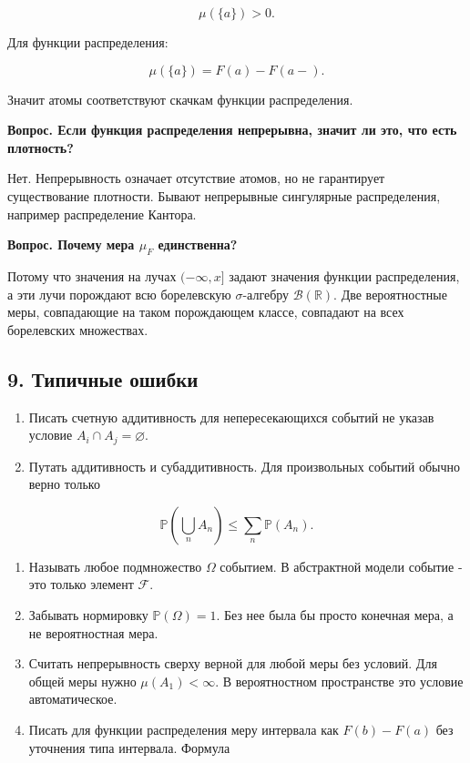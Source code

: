 \documentclass[
  11pt,
  a4paper,
]{article}
\begin{document}
\[
\mu(\{a\})>0.
\]

Для функции распределения:

\[
\mu(\{a\})=F(a)-F(a-).
\]

Значит атомы соответствуют скачкам функции распределения.

\textbf{Вопрос. Если функция распределения непрерывна, значит ли это,
что есть плотность?}

Нет. Непрерывность означает отсутствие атомов, но не гарантирует
существование плотности. Бывают непрерывные сингулярные распределения,
например распределение Кантора.

\textbf{Вопрос. Почему мера \(\mu_F\) единственна?}

Потому что значения на лучах \((-\infty,x]\) задают значения функции
распределения, а эти лучи порождают всю борелевскую \(\sigma\)-алгебру
\(\mathcal B(\mathbb R)\). Две вероятностные меры, совпадающие на таком
порождающем классе, совпадают на всех борелевских множествах.

\subsection{9. Типичные
ошибки}\label{ux442ux438ux43fux438ux447ux43dux44bux435-ux43eux448ux438ux431ux43aux438}

\begin{enumerate}
\def\labelenumi{\arabic{enumi}.}
\item
  Писать счетную аддитивность для непересекающихся событий не указав
  условие \(A_i\cap A_j=\varnothing\).
\item
  Путать аддитивность и субаддитивность. Для произвольных событий обычно
  верно только
\end{enumerate}

\[
\mathbb P\left(\bigcup_n A_n\right)\le\sum_n\mathbb P(A_n).
\]

\begin{enumerate}
\def\labelenumi{\arabic{enumi}.}
\setcounter{enumi}{2}
\item
  Называть любое подмножество \(\Omega\) событием. В абстрактной модели
  событие - это только элемент \(\mathcal F\).
\item
  Забывать нормировку \(\mathbb P(\Omega)=1\). Без нее была бы просто
  конечная мера, а не вероятностная мера.
\item
  Считать непрерывность сверху верной для любой меры без условий. Для
  общей меры нужно \(\mu(A_1)<\infty\). В вероятностном пространстве это
  условие автоматическое.
\item
  Писать для функции распределения меру интервала как \(F(b)-F(a)\) без
  уточнения типа интервала. Формула
\end{enumerate}
\end{document}
